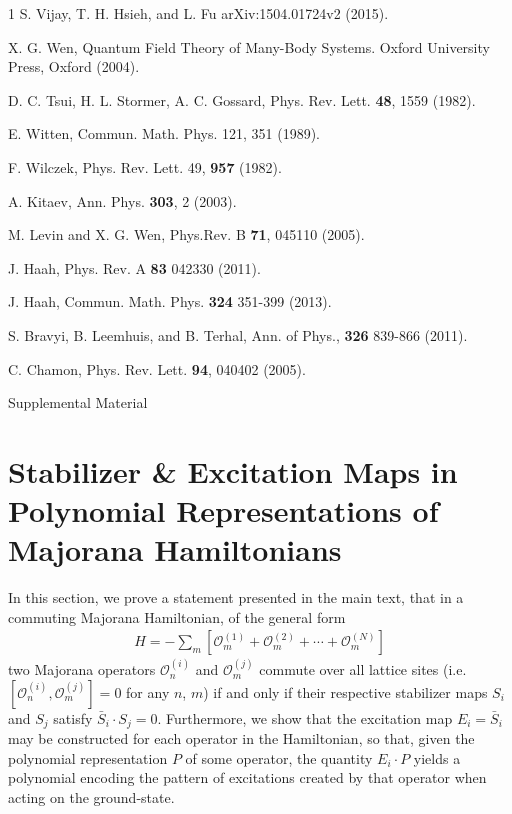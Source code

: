 \documentclass[aps,twocolumn,preprintnumbers,floatfix,showpacs,prx]{revtex4-1}
\begin{document}
\begin{thebibliography}{1}
S. Vijay, T. H. Hsieh, and L. Fu arXiv:1504.01724v2 (2015).


X. G. Wen, Quantum Field Theory of Many-Body Systems. Oxford University Press, Oxford (2004). 

D. C. Tsui, H. L. Stormer, A. C. Gossard, Phys. Rev. Lett. {\bf 48}, 1559 (1982).

E. Witten, Commun. Math. Phys. 121, 351 (1989). 

F. Wilczek, Phys. Rev. Lett. 49, {\bf 957} (1982).

A. Kitaev, Ann. Phys. {\bf 303}, 2 (2003). 

M. Levin and X. G. Wen, Phys.Rev. B {\bf 71},  045110  (2005).

J. Haah, Phys. Rev. A {\bf 83} 042330 (2011).

J. Haah, Commun. Math. Phys. {\bf 324}  351-399 (2013).

S. Bravyi, B. Leemhuis, and B. Terhal, Ann. of Phys., {\bf 326} 839-866 (2011).

C. Chamon, Phys. Rev. Lett. {\bf 94}, 040402 (2005).

 Supplemental Material
\end{thebibliography}



\appendix

\section{Stabilizer \& Excitation Maps in Polynomial Representations of Majorana Hamiltonians}
\label{app:commutingOperators}

In this section, we prove a statement presented in the main text, that in a commuting Majorana Hamiltonian, of the general form
\begin{align}
H = -\sum_{m}\left[\mathcal{O}^{(1)}_{m} + \mathcal{O}^{(2)}_{m} + \cdots + \mathcal{O}^{(N)}_{m}\right]
\end{align}
two Majorana operators $\mathcal{O}^{(i)}_{n}$ and $\mathcal{O}^{(j)}_{m}$ commute over all lattice sites (i.e. $[\mathcal{O}^{(i)}_{n}, \mathcal{O}^{(j)}_{m}] = 0$ for any $n$, $m$) if and only if their respective stabilizer maps $S_{i}$ and $S_{j}$ satisfy $\bar{S}_{i}\cdot S_{j} = 0$.  Furthermore, we show that the excitation map $E_{i} = \bar{S}_{i}$ may be constructed for each operator in the Hamiltonian, so that, given the polynomial representation $P$ of some operator, the quantity $E_{i}\cdot P$ yields a polynomial encoding the pattern of excitations created by that operator when acting on the ground-state.  
\end{document}
